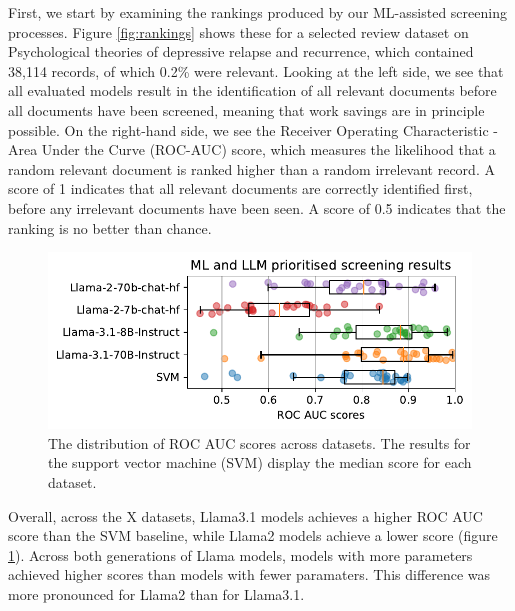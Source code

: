 \documentclass{article}
\begin{document}
	First, we start by examining the rankings produced by our ML-assisted screening processes. Figure \ref{fig:rankings} shows these for a selected review dataset on Psychological theories of depressive relapse and recurrence, which contained 38,114 records, of which 0.2\% were relevant. Looking at the left side, we see that all evaluated models result in the identification of all relevant documents before all documents have been screened, meaning that work savings are in principle possible. On the right-hand side, we see the Receiver Operating Characteristic - Area Under the Curve (ROC-AUC) score, which measures the likelihood that a random relevant document is ranked higher than a random irrelevant record. A score of 1 indicates that all relevant documents are correctly identified first, before any irrelevant documents have been seen. A score of 0.5 indicates that the ranking is no better than chance.
	

\begin{figure}
	\includegraphics[width=\columnwidth]{../../figures/macro_comparison.pdf}
	\caption{The distribution of ROC AUC scores across datasets. The results for the support vector machine (SVM) display the median score for each dataset.}
	\label{fig:macro}
\end{figure}

\begin{table}
	\centering
	
	\caption{Recall achieved at the 1-confidence percentile across model runs. Values below the recall target are highlighted in bold.}
	\label{tab:recall}
\end{table}

	
	
	Overall, across the X datasets, Llama3.1 models achieves a higher ROC AUC score than the SVM baseline, while Llama2 models achieve a lower score (figure \ref{fig:macro}). Across both generations of Llama models, models with more parameters achieved higher scores than models with fewer paramaters. This difference was more pronounced for Llama2 than for Llama3.1. 
	
\end{document}
